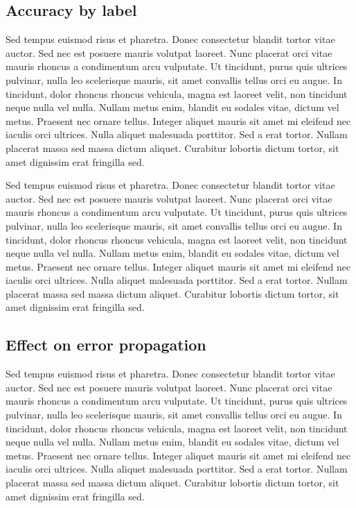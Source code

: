 \documentclass[11pt,letterpaper]{article}
\begin{document}
\subsection{Accuracy by label}

Sed tempus euismod risus et pharetra. Donec consectetur blandit tortor vitae auctor. Sed nec est posuere mauris volutpat laoreet. Nunc placerat orci vitae mauris rhoncus a condimentum arcu vulputate. Ut tincidunt, purus quis ultrices pulvinar, nulla leo scelerisque mauris, sit amet convallis tellus orci eu augue. In tincidunt, dolor rhoncus rhoncus vehicula, magna est laoreet velit, non tincidunt neque nulla vel nulla. Nullam metus enim, blandit eu sodales vitae, dictum vel metus. Praesent nec ornare tellus. Integer aliquet mauris sit amet mi eleifend nec iaculis orci ultrices. Nulla aliquet malesuada porttitor. Sed a erat tortor. Nullam placerat massa sed massa dictum aliquet. Curabitur lobortis dictum tortor, sit amet dignissim erat fringilla sed.

Sed tempus euismod risus et pharetra. Donec consectetur blandit tortor vitae auctor. Sed nec est posuere mauris volutpat laoreet. Nunc placerat orci vitae mauris rhoncus a condimentum arcu vulputate. Ut tincidunt, purus quis ultrices pulvinar, nulla leo scelerisque mauris, sit amet convallis tellus orci eu augue. In tincidunt, dolor rhoncus rhoncus vehicula, magna est laoreet velit, non tincidunt neque nulla vel nulla. Nullam metus enim, blandit eu sodales vitae, dictum vel metus. Praesent nec ornare tellus. Integer aliquet mauris sit amet mi eleifend nec iaculis orci ultrices. Nulla aliquet malesuada porttitor. Sed a erat tortor. Nullam placerat massa sed massa dictum aliquet. Curabitur lobortis dictum tortor, sit amet dignissim erat fringilla sed.


\subsection{Effect on error propagation}

Sed tempus euismod risus et pharetra. Donec consectetur blandit tortor vitae auctor. Sed nec est posuere mauris volutpat laoreet. Nunc placerat orci vitae mauris rhoncus a condimentum arcu vulputate. Ut tincidunt, purus quis ultrices pulvinar, nulla leo scelerisque mauris, sit amet convallis tellus orci eu augue. In tincidunt, dolor rhoncus rhoncus vehicula, magna est laoreet velit, non tincidunt neque nulla vel nulla. Nullam metus enim, blandit eu sodales vitae, dictum vel metus. Praesent nec ornare tellus. Integer aliquet mauris sit amet mi eleifend nec iaculis orci ultrices. Nulla aliquet malesuada porttitor. Sed a erat tortor. Nullam placerat massa sed massa dictum aliquet. Curabitur lobortis dictum tortor, sit amet dignissim erat fringilla sed.
\end{document}
